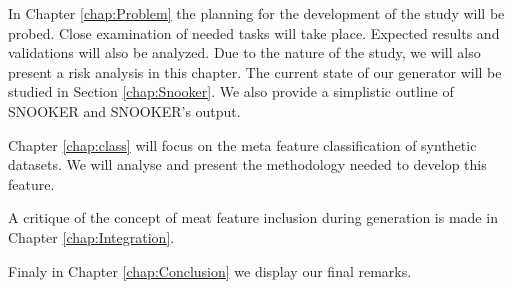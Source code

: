 In Chapter \ref{chap:Problem} the planning for the development of the study will be probed. Close examination of needed tasks will take place. Expected results and validations will also be analyzed. Due to the nature of the study, we will also present a risk analysis in this chapter. The current state of our generator will be studied in Section \ref{chap:Snooker}. We also provide a simplistic outline of SNOOKER and SNOOKER's output.

Chapter \ref{chap:class} will focus on the meta feature classification of synthetic datasets. We will analyse and present the methodology needed to develop this feature.

A critique of the concept of meat feature inclusion during generation is made in Chapter \ref{chap:Integration}.

Finaly in Chapter \ref{chap:Conclusion} we display our final remarks.